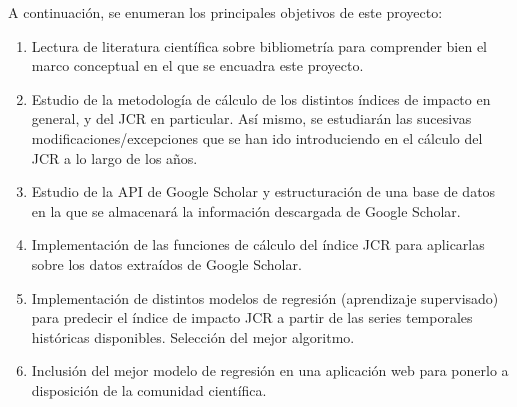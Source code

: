 
A continuación, se enumeran los principales objetivos de este proyecto:

\begin{enumerate}
\item Lectura de literatura científica sobre bibliometría para comprender bien el marco conceptual en el que se encuadra este proyecto.
\item Estudio de la metodología de cálculo de los distintos índices de impacto en general, y del JCR en particular. Así mismo, se estudiarán las sucesivas modificaciones/excepciones que se han ido introduciendo en el cálculo del JCR a lo largo de los años.
\item Estudio de la API de Google Scholar y estructuración de una base de datos en la que se almacenará la información descargada de Google Scholar.
\item Implementación de las funciones de cálculo del índice JCR para aplicarlas sobre los datos extraídos de Google Scholar. 
\item Implementación de distintos modelos de regresión (aprendizaje supervisado) para predecir el índice de impacto JCR a partir de las series temporales históricas disponibles. Selección del mejor algoritmo.
\item Inclusión del mejor modelo de regresión en una aplicación web para ponerlo a disposición de la comunidad científica.
\end{enumerate}